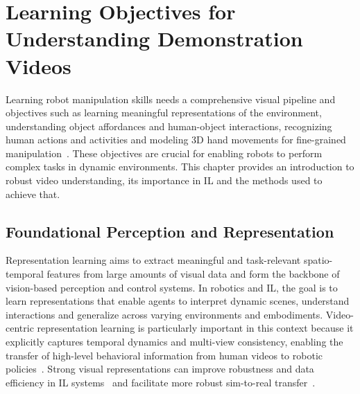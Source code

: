 


\chapter{Learning Objectives for Understanding Demonstration Videos}
\label{chap:RobotLearningObjectivesForUnderstandingDemonstrationVideos}

\minitoc
Learning robot manipulation skills needs a comprehensive visual pipeline and objectives such as learning meaningful representations of the environment, understanding object affordances and human-object interactions, recognizing human actions and activities and modeling 3D hand movements for fine-grained manipulation~\cite{Eze2024LearningBW}. These objectives are crucial for enabling robots to perform complex tasks in dynamic environments. This chapter provides an introduction to robust video understanding, its importance in \ac{IL} and the methods used to achieve that.









\section{Foundational Perception and Representation}
Representation learning aims to extract meaningful and task-relevant spatio-temporal features from large amounts of visual data and form the backbone of vision-based perception and control systems. In robotics and \ac{IL}, the goal is to learn representations that enable agents to interpret dynamic scenes, understand interactions and generalize across varying environments and embodiments. Video-centric representation learning is particularly important in this context because it explicitly captures temporal dynamics and multi-view consistency, enabling the transfer of high-level behavioral information from human videos to robotic policies~\cite{Sermanet2017TimeContrastiveNS, Radosavovic2022RealWorldRL}. Strong visual representations can improve robustness and data efficiency in \ac{IL} systems~\cite{Eze2024LearningBW} and facilitate more robust sim-to-real transfer~\cite{Nair2022R3MAU}.

